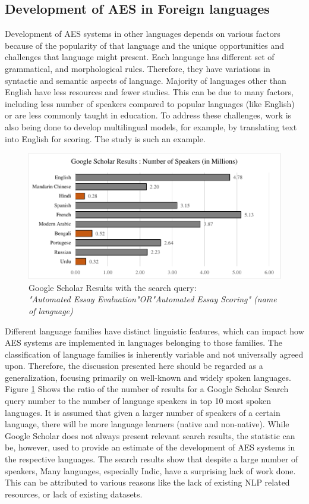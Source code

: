 \documentclass{article}
\begin{document}
	\subsection{Development of AES in Foreign languages}
	Development of AES systems in other languages depends on various factors because of the popularity of that language and the unique opportunities and challenges that language might present. Each language has different set of grammatical, and morphological rules. Therefore, they have variations in syntactic and semantic aspects of language.
	Majority of languages other than English have less resources and fewer studies. This can be due to many factors, including less number of speakers compared to popular languages (like English) or are less commonly taught in education.
	To address these challenges, work is also being done to develop multilingual models, for example,  by translating text into English for scoring. The study \textcite{firoozi2024bert} is such an example. 
	\begin{figure}
		\centering
		\includegraphics[width=\textwidth]{img/ratio.pdf}
		\caption{Google Scholar Results with the search query: \\
			\textit{"Automated Essay Evaluation"OR"Automated Essay Scoring" (name of language)}}
		
		\label{searchresult}
	\end{figure}
	Different language families have distinct linguistic features, which can impact how AES systems are implemented in languages belonging to those families. The classification of language families is inherently variable and not universally agreed upon. Therefore, the discussion presented here should be regarded as a generalization, focusing primarily on well-known and widely spoken languages. \\
	Figure \ref{searchresult} Shows the ratio of the number of results for a Google Scholar Search query number to the number of language speakers \cite{wikitotalspeakers} in top 10 most spoken languages. It is assumed that given a larger number of speakers of a certain language, there will be more language learners (native and non-native). While Google Scholar does not always present relevant search results, the statistic can be, however, used to provide an estimate of the development of AES systems in the respective languages. The search results show that despite a large number of speakers, Many languages, especially Indic, have a surprising lack of work done. This can be attributed to various reasons like the lack of existing NLP related resources, or lack of existing datasets. \\
\end{document}
